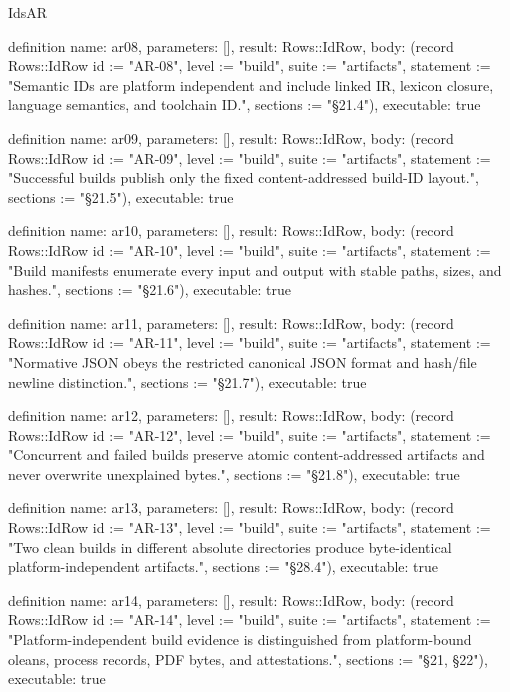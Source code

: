 \begin{lexlean}{IdsAR}
\begin{semanticmodule}
definition{
  name: ar08,
  parameters: [],
  result: Rows::IdRow,
  body: (record Rows::IdRow {id := "AR-08", level := "build", suite := "artifacts", statement := "Semantic IDs are platform independent and include linked IR, lexicon closure, language semantics, and toolchain ID.", sections := "§21.4"}),
  executable: true
}

definition{
  name: ar09,
  parameters: [],
  result: Rows::IdRow,
  body: (record Rows::IdRow {id := "AR-09", level := "build", suite := "artifacts", statement := "Successful builds publish only the fixed content-addressed build-ID layout.", sections := "§21.5"}),
  executable: true
}

definition{
  name: ar10,
  parameters: [],
  result: Rows::IdRow,
  body: (record Rows::IdRow {id := "AR-10", level := "build", suite := "artifacts", statement := "Build manifests enumerate every input and output with stable paths, sizes, and hashes.", sections := "§21.6"}),
  executable: true
}

definition{
  name: ar11,
  parameters: [],
  result: Rows::IdRow,
  body: (record Rows::IdRow {id := "AR-11", level := "build", suite := "artifacts", statement := "Normative JSON obeys the restricted canonical JSON format and hash/file newline distinction.", sections := "§21.7"}),
  executable: true
}

definition{
  name: ar12,
  parameters: [],
  result: Rows::IdRow,
  body: (record Rows::IdRow {id := "AR-12", level := "build", suite := "artifacts", statement := "Concurrent and failed builds preserve atomic content-addressed artifacts and never overwrite unexplained bytes.", sections := "§21.8"}),
  executable: true
}

definition{
  name: ar13,
  parameters: [],
  result: Rows::IdRow,
  body: (record Rows::IdRow {id := "AR-13", level := "build", suite := "artifacts", statement := "Two clean builds in different absolute directories produce byte-identical platform-independent artifacts.", sections := "§28.4"}),
  executable: true
}

definition{
  name: ar14,
  parameters: [],
  result: Rows::IdRow,
  body: (record Rows::IdRow {id := "AR-14", level := "build", suite := "artifacts", statement := "Platform-independent build evidence is distinguished from platform-bound oleans, process records, PDF bytes, and attestations.", sections := "§21, §22"}),
  executable: true
}


\end{semanticmodule}
\end{lexlean}
